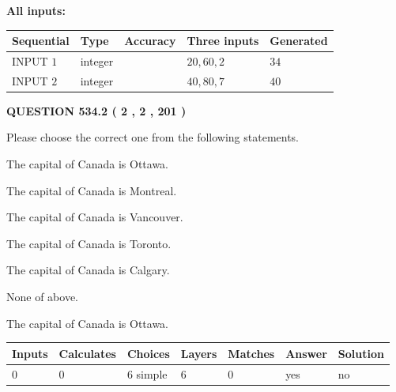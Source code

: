 \documentclass[12pt]{article}
\begin{document}
   
   
   
\noindent\vspace{0.1in}\hspace{-0.08in} {\textbf{\Large{All inputs: }}}
   
   
  
  
\noindent\begin{tabular}{|l|l|l|l|l|}
\hline
 Sequential & Type & Accuracy & Three inputs & Generated \\ 
\hline
 
 
  INPUT $  1 $ & integer &  & $
 20
 , 
 60
 , 
 2
 $ & $ 34 $ 
 \\  \hline  
 
 
  INPUT $  2 $ & integer &  & $
 40
 , 
 80
 , 
 7
 $ & $ 40 $ 
 \\  \hline  
 \end{tabular}
   
   
  
\vspace{0.2in}
  
{\textbf{\Large{QUESTION
534.2 
 ( 2 , 2 , 201 )
}}}
  
  
Please choose the correct one from the following statements.
 
 
The capital of Canada is Ottawa.
 
 
The capital of Canada is Montreal.
 
 
The capital of Canada is Vancouver.
 
 
The capital of Canada is Toronto.
 
 
The capital of Canada is Calgary.
 
 
 None of above.
 
 
\noindent{}
 
 
The capital of Canada is Ottawa.
 
 
\noindent{}
 
 
   
   
   
   
\noindent\begin{tabular}{|l|l|l|l|l|l|l|}
 \hline
Inputs & Calculates & Choices & Layers & Matches & Answer & Solution \\ \hline
 0  & 
 0  & 
 6
  simple  
  & 
 6  & 
 0  & 
  yes & 
  no 
  \\ \hline
 \end{tabular}
   
\end{document}
